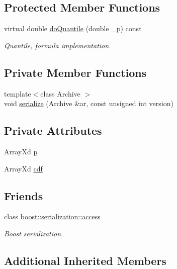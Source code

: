\subsection*{Protected Member Functions}
\begin{DoxyCompactItemize}
\item 
virtual double \hyperlink{class_c_categorical_d_r_v_ad13850307d82f7d771a8e658305f2083}{do\-Quantile} (double \-\_\-p) const 
\begin{DoxyCompactList}\small\item\em Quantile, formula implementation. \end{DoxyCompactList}\end{DoxyCompactItemize}
\subsection*{Private Member Functions}
\begin{DoxyCompactItemize}
\item 
{\footnotesize template$<$class Archive $>$ }\\void \hyperlink{class_c_categorical_d_r_v_a7d834148a34cfdabdb71040858032fcf}{serialize} (Archive \&ar, const unsigned int version)
\end{DoxyCompactItemize}
\subsection*{Private Attributes}
\begin{DoxyCompactItemize}
\item 
Array\-Xd \hyperlink{class_c_categorical_d_r_v_ae7de998dd49975a1be0de37cbc4f23b5}{p}
\item 
Array\-Xd \hyperlink{class_c_categorical_d_r_v_a78c2837dfae368a3ecdbb416b0e9d094}{cdf}
\end{DoxyCompactItemize}
\subsection*{Friends}
\begin{DoxyCompactItemize}
\item 
class \hyperlink{class_c_categorical_d_r_v_ac98d07dd8f7b70e16ccb9a01abf56b9c}{boost\-::serialization\-::access}
\begin{DoxyCompactList}\small\item\em Boost serialization. \end{DoxyCompactList}\end{DoxyCompactItemize}
\subsection*{Additional Inherited Members}


